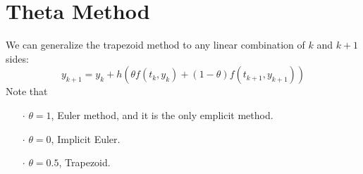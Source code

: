 \documentclass[a4paper, 11pt]{article}
\begin{document}
\section{Theta Method}
We can generalize the trapezoid method to any linear combination of $k$ and $k+1$ sides:
$$
y_{k+1} = y_k + h(\theta f(t_k, y_k) + (1-\theta)f(t_{k+1}, y_{k+1}))
$$
Note that
\begin{itemize}
	\item[$\cdot$] $\theta=1$, Euler method, and it is the only emplicit method.
	\item[$\cdot$] $\theta=0$, Implicit Euler.
	\item[$\cdot$] $\theta=0.5$, Trapezoid.
\end{itemize}
\end{document}
